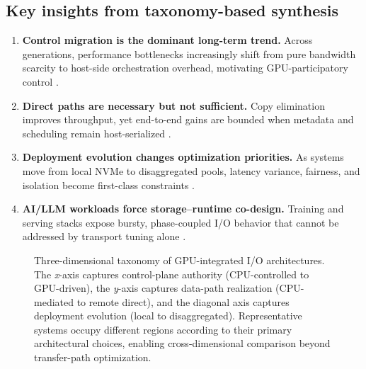\subsection{Key insights from taxonomy-based synthesis}

\begin{enumerate}
    \item \textbf{Control migration is the dominant long-term trend.} Across generations, performance bottlenecks increasingly shift from pure bandwidth scarcity to host-side orchestration overhead, motivating GPU-participatory control \cite{silberstein2013gpufs,qureshi2023bam,nvidia_gds_overview}.
    \item \textbf{Direct paths are necessary but not sufficient.} Copy elimination improves throughput, yet end-to-end gains are bounded when metadata and scheduling remain host-serialized \cite{nvidia_gds_best_practices,nvidia_gdrdma,murray2021tfdata}.
    \item \textbf{Deployment evolution changes optimization priorities.} As systems move from local NVMe to disaggregated pools, latency variance, fairness, and isolation become first-class constraints \cite{nvmeof_spec,liu2017rackscale,zhang2025hpcstoragesurvey}.
    \item \textbf{AI/LLM workloads force storage--runtime co-design.} Training and serving stacks expose bursty, phase-coupled I/O behavior that cannot be addressed by transport tuning alone \cite{rajbhandari2021zeroinfinity,kwon2023vllm,zhong2024distserve}.
\end{enumerate}

\begin{figure}[t]
  \centering
  
  \caption{Three-dimensional taxonomy of GPU-integrated I/O architectures. The \emph{x}-axis captures control-plane authority (CPU-controlled to GPU-driven), the \emph{y}-axis captures data-path realization (CPU-mediated to remote direct), and the diagonal axis captures deployment evolution (local to disaggregated). Representative systems occupy different regions according to their primary architectural choices, enabling cross-dimensional comparison beyond transfer-path optimization.}
  \label{fig:taxonomy-3d}
\end{figure}
